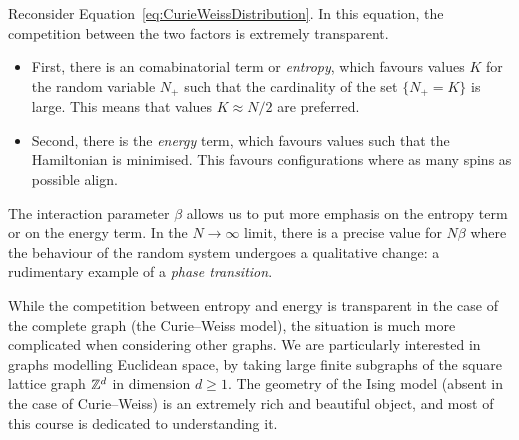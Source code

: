 \begin{remark}
    Reconsider Equation~\eqref{eq:CurieWeissDistribution}.
    In this equation, the competition between the two factors is extremely transparent.
    \begin{itemize}
        \item     First, there is an comabinatorial term or \emph{entropy}, which favours values $K$ for the random variable
        $N_+$ such that the cardinality of the set $\{N_+=K\}$ is large.
        This means that values $K\approx N/2$ are preferred.
        \item     Second, there is the \emph{energy} term, which favours values such that the Hamiltonian 
        is minimised. This favours configurations where as many spins as possible align.    
    \end{itemize}
    The interaction parameter $\beta$ allows us to put more emphasis
    on the entropy term or on the energy term.
    In the $N\to\infty$ limit, there is a precise value for $N\beta$
    where the behaviour of the random system undergoes a qualitative change:
    a rudimentary example of a  \emph{phase transition}.
\end{remark}

While the competition between entropy and energy is transparent in the
case of the complete graph (the Curie--Weiss model), the situation is much more
complicated when considering other graphs.
We are particularly interested in graphs modelling Euclidean space,
by taking large finite subgraphs of the square lattice graph $\mathbb Z^d$
in dimension $d\geq 1$.
The geometry of the Ising model (absent in the case of Curie--Weiss)
is an extremely rich and beautiful object,
and most of this course is dedicated to understanding it.
